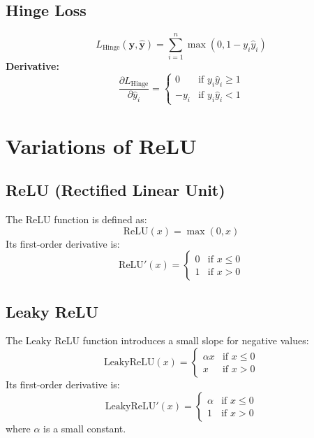 \documentclass{article}
\begin{document}
\subsection{Hinge Loss}
\begin{equation}
L_{\text{Hinge}}(\mathbf{y}, \hat{\mathbf{y}}) = \sum_{i=1}^{n} \max(0, 1 - y_i \hat{y}_i)
\end{equation}
\textbf{Derivative:}
\begin{equation}
\frac{\partial L_{\text{Hinge}}}{\partial \hat{y}_i} = 
\begin{cases} 
0 & \text{if } y_i \hat{y}_i \geq 1 \\
-y_i & \text{if } y_i \hat{y}_i < 1
\end{cases}
\end{equation}








\section{Variations of ReLU}

\subsection{ReLU (Rectified Linear Unit)}
The ReLU function is defined as:
\begin{equation}
\text{ReLU}(x) = \max(0, x)
\end{equation}
Its first-order derivative is:
\begin{equation}
\text{ReLU}'(x) = 
\begin{cases} 
0 & \text{if } x \leq 0 \\
1 & \text{if } x > 0 
\end{cases}
\end{equation}

\subsection{Leaky ReLU}
The Leaky ReLU function introduces a small slope for negative values:
\begin{equation}
\text{LeakyReLU}(x) = 
\begin{cases} 
\alpha x & \text{if } x \leq 0 \\
x & \text{if } x > 0 
\end{cases}
\end{equation}
Its first-order derivative is:
\begin{equation}
\text{LeakyReLU}'(x) = 
\begin{cases} 
\alpha & \text{if } x \leq 0 \\
1 & \text{if } x > 0 
\end{cases}
\end{equation}
where \( \alpha \) is a small constant.
\end{document}
